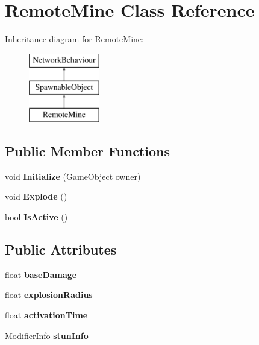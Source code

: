 \hypertarget{class_remote_mine}{}\section{Remote\+Mine Class Reference}
\label{class_remote_mine}
Inheritance diagram for Remote\+Mine\+:\begin{figure}[H]
\begin{center}
\leavevmode
\includegraphics[height=3.000000cm]{class_remote_mine}
\end{center}
\end{figure}
\subsection*{Public Member Functions}
\begin{DoxyCompactItemize}
\item 
\hypertarget{class_remote_mine_a0e1008c7628c43554c7d6fcc93eadf5d}{}\label{class_remote_mine_a0e1008c7628c43554c7d6fcc93eadf5d} 
void {\bfseries Initialize} (Game\+Object owner)
\item 
\hypertarget{class_remote_mine_aa582a67d635b19b6dd31f0a74096a665}{}\label{class_remote_mine_aa582a67d635b19b6dd31f0a74096a665} 
void {\bfseries Explode} ()
\item 
\hypertarget{class_remote_mine_acb9610f39975614b7dc44339d08f6eaf}{}\label{class_remote_mine_acb9610f39975614b7dc44339d08f6eaf} 
bool {\bfseries Is\+Active} ()
\end{DoxyCompactItemize}
\subsection*{Public Attributes}
\begin{DoxyCompactItemize}
\item 
\hypertarget{class_remote_mine_a94c4392f182757ac3874b7eb91ef98aa}{}\label{class_remote_mine_a94c4392f182757ac3874b7eb91ef98aa} 
float {\bfseries base\+Damage}
\item 
\hypertarget{class_remote_mine_a527bdcee7d2c221a3c748f79cf566448}{}\label{class_remote_mine_a527bdcee7d2c221a3c748f79cf566448} 
float {\bfseries explosion\+Radius}
\item 
\hypertarget{class_remote_mine_a06ff0fd858b848008910e50a54e818a1}{}\label{class_remote_mine_a06ff0fd858b848008910e50a54e818a1} 
float {\bfseries activation\+Time}
\item 
\hypertarget{class_remote_mine_a868beb24464a3c4c58d9badca45880d4}{}\label{class_remote_mine_a868beb24464a3c4c58d9badca45880d4} 
\hyperlink{struct_modifier_info}{Modifier\+Info} {\bfseries stun\+Info}
\end{DoxyCompactItemize}
